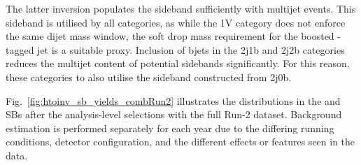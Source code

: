 \medskip

\noindent{}The latter inversion populates the sideband sufficiently with multijet events. This sideband is utilised by all \VH categories, as while the 1V category does not enforce the same dijet mass window, the soft drop mass requirement for the boosted \PVec-tagged \gls{jet} is a suitable proxy. Inclusion of \glspl{bjet} in the 2j1b and 2j2b categories reduces the multijet content of potential sidebands significantly. For this reason, these categories to also utilise the sideband constructed from 2j0b.

Fig.~\ref{fig:htoinv_sb_yields_combRun2} illustrates the \ptmiss distributions in the \ttH and \VH \glspl{SB} after the analysis-level selections with the full Run-2 dataset. Background estimation is performed separately for each year due to the differing running conditions, detector configuration, and the different effects or features seen in the data.

